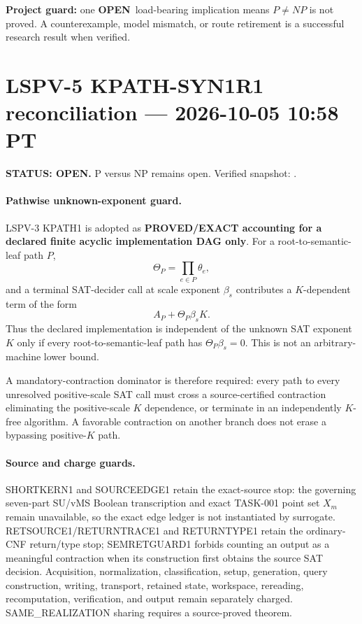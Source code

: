 \documentclass[11pt]{article}
\newcommand{\statusopen}{\textcolor{openstatus}{\textbf{OPEN}}}
\begin{document}
\vfill
\begin{center}
\small
\textbf{Project guard:} one \statusopen\ load-bearing implication means \(P\neq NP\) is not proved.
A counterexample, model mismatch, or route retirement is a successful research result when verified.
\end{center}



\section{LSPV-5 KPATH-SYN1R1 reconciliation --- 2026-10-05 10:58 PT}
\textbf{STATUS: OPEN.} P versus NP remains open. Verified snapshot:
.

\paragraph{Pathwise unknown-exponent guard.}
LSPV-3 KPATH1 is adopted as \textbf{PROVED/EXACT accounting for a declared finite acyclic implementation DAG only}. For a root-to-semantic-leaf path \(P\),
\[
\Theta_P=\prod_{e\in P}\theta_e,
\]
and a terminal SAT-decider call at scale exponent \(\beta_s\) contributes a \(K\)-dependent term of the form
\[
A_P+\Theta_P\beta_sK.
\]
Thus the declared implementation is independent of the unknown SAT exponent \(K\) only if every root-to-semantic-leaf path has \(\Theta_P\beta_s=0\). This is not an arbitrary-machine lower bound.

A mandatory-contraction dominator is therefore required: every path to every unresolved positive-scale SAT call must cross a source-certified contraction eliminating the positive-scale \(K\) dependence, or terminate in an independently \(K\)-free algorithm. A favorable contraction on another branch does not erase a bypassing positive-\(K\) path.

\paragraph{Source and charge guards.}
SHORTKERN1 and SOURCEEDGE1 retain the exact-source stop: the governing seven-part SU/vMS Boolean transcription and exact TASK-001 point set \(X_m\) remain unavailable, so the exact edge ledger is not instantiated by surrogate. RETSOURCE1/RETURNTRACE1 and RETURNTYPE1 retain the ordinary-CNF return/type stop; SEMRETGUARD1 forbids counting an output as a meaningful contraction when its construction first obtains the source SAT decision. Acquisition, normalization, classification, setup, generation, query construction, writing, transport, retained state, workspace, rereading, recomputation, verification, and output remain separately charged. SAME\_REALIZATION sharing requires a source-proved theorem.
\end{document}
